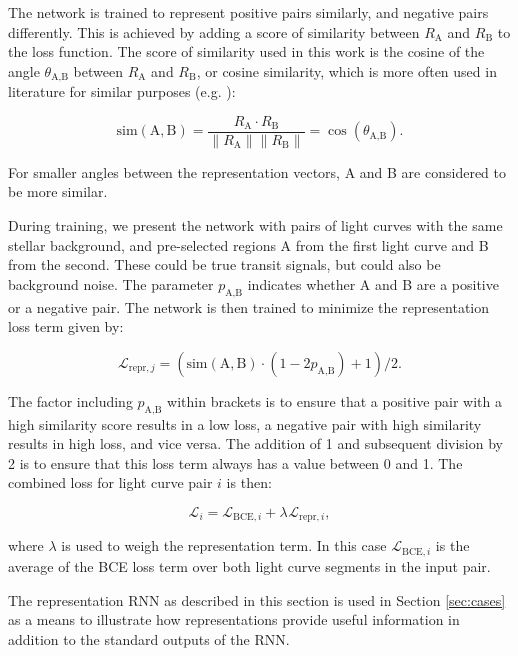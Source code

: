 The network is trained to represent positive pairs similarly, and negative pairs differently. This is achieved by adding a score of similarity between $R_\text{A}$ and $R_\text{B}$ to the loss function. The score of similarity used in this work is the cosine of the angle $\theta_{\text{A}, \text{B}}$ between $R_\text{A}$ and $R_\text{B}$, or cosine similarity, which is more often used in literature for similar purposes (e.g. \citealp{dong2006cosine}):

\begin{equation}
    \text{sim}(\text{A}, \text{B})  = \frac{R_\text{A} \cdot R_\text{B}}{\|R_\text{A}\|\|R_\text{B}\|} = \cos(\theta_{\text{A}, \text{B}}).
\end{equation}

\noindent For smaller angles between the representation vectors, A and B are considered to be more similar.

During training, we present the network with pairs of light curves with the same stellar background, and pre-selected regions A from the first light curve and B from the second. These could be true transit signals, but could also be background noise. The parameter $p_{\text{A},\text{B}}$ indicates whether A and B are a positive or a negative pair. The network is then trained to minimize the representation loss term given by:

\begin{equation}
   \mathcal{L}_{\text{repr}, j} =(\text{sim}(\text{A}, \text{B}) \cdot(1 - 2  p_{\text{A},\text{B}}) + 1) / 2.
\end{equation}

\noindent The factor including $p_{\text{A},\text{B}}$ within brackets is to ensure that a positive pair with a high similarity score results in a low loss, a negative pair with high similarity results in high loss, and vice versa. The addition of 1 and subsequent division by 2 is to ensure that this loss term always has a value between 0 and 1. The combined loss for light curve pair $i$ is then:

\begin{equation}
    \mathcal{L}_{i} = \mathcal{L}_{\text{BCE}, i} + \lambda_{} \mathcal{L}_{\text{repr}, i},
\end{equation}

\noindent where $\lambda$ is used to weigh the representation term. In this case $\mathcal{L}_{\text{BCE}, i}$ is the average of the BCE loss term over both light curve segments in the input pair.

The representation RNN as described in this section is used in Section \ref{sec:cases} as a means to illustrate how representations provide useful information in addition to the standard outputs of the RNN. 